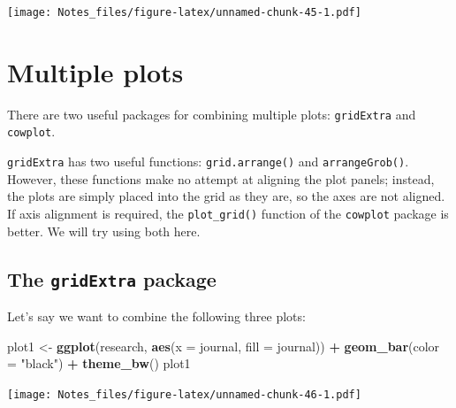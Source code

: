 \documentclass[
]{book}
\newenvironment{Shaded}{\begin{snugshade}}{\end{snugshade}}
\newcommand{\DataTypeTok}[1]{\textcolor[rgb]{0.13,0.29,0.53}{#1}}
\newcommand{\KeywordTok}[1]{\textcolor[rgb]{0.13,0.29,0.53}{\textbf{#1}}}
\newcommand{\NormalTok}[1]{#1}
\newcommand{\OperatorTok}[1]{\textcolor[rgb]{0.81,0.36,0.00}{\textbf{#1}}}
\newcommand{\StringTok}[1]{\textcolor[rgb]{0.31,0.60,0.02}{#1}}
\begin{document}
\texttt{[image: Notes\_files/figure-latex/unnamed-chunk-45-1.pdf]}

\hypertarget{multiple-plots}{%
\section{Multiple plots}\label{multiple-plots}}

There are two useful packages for combining multiple plots: \texttt{gridExtra} and \texttt{cowplot}.

\texttt{gridExtra} has two useful functions: \texttt{grid.arrange()} and \texttt{arrangeGrob()}. However, these functions make no attempt at aligning the plot panels; instead, the plots are simply placed into the grid as they are, so the axes are not aligned. If axis alignment is required, the \texttt{plot\_grid()} function of the \texttt{cowplot} package is better. We will try using both here.

\hypertarget{the-gridextra-package}{%
\subsection*{\texorpdfstring{The \texttt{gridExtra} package}{The gridExtra package}}\label{the-gridextra-package}}

Let's say we want to combine the following three plots:

\begin{Shaded}
\begin{Highlighting}[]
\NormalTok{plot1 <-}\StringTok{ }\KeywordTok{ggplot}\NormalTok{(research, }\KeywordTok{aes}\NormalTok{(}\DataTypeTok{x =}\NormalTok{ journal, }\DataTypeTok{fill =}\NormalTok{ journal)) }\OperatorTok{+}
\StringTok{    }\KeywordTok{geom_bar}\NormalTok{(}\DataTypeTok{color =} \StringTok{"black"}\NormalTok{) }\OperatorTok{+}
\StringTok{    }\KeywordTok{theme_bw}\NormalTok{()}
\NormalTok{plot1}
\end{Highlighting}
\end{Shaded}

\texttt{[image: Notes\_files/figure-latex/unnamed-chunk-46-1.pdf]}
\end{document}
